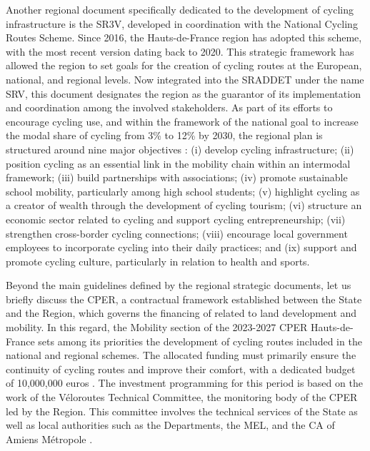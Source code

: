 \begin{refsegment}
Another regional document specifically dedicated to the development of cycling infrastructure is the \acrfull{SR3V}, developed in coordination with the National Cycling Routes Scheme. Since 2016, the Hauts-de-France region has adopted this scheme, with the most recent version dating back to 2020. This strategic framework has allowed the region to set goals for the creation of cycling routes at the European, national, and regional levels. Now integrated into the \acrshort{SRADDET} under the name \acrfull{SRV}, this document designates the region as the guarantor of its implementation and coordination among the involved stakeholders. As part of its efforts to encourage cycling use, and within the framework of the national goal to increase the modal share of cycling from 3\% to 12\% by 2030, the regional plan is structured around nine major objectives \textcolor{blue}{\autocite[10]{region_hauts-de-france_plan_2023}}: (i) develop cycling infrastructure; (ii) position cycling as an essential link in the mobility chain within an intermodal framework; (iii) build partnerships with associations; (iv) promote sustainable school mobility, particularly among high school students; (v) highlight cycling as a creator of wealth through the development of cycling tourism; (vi) structure an economic sector related to cycling and support cycling entrepreneurship; (vii) strengthen cross-border cycling connections; (viii) encourage local government employees to incorporate cycling into their daily practices; and (ix) support and promote cycling culture, particularly in relation to health and sports.%

Beyond the main guidelines defined by the regional strategic documents, let us briefly discuss the \acrfull{CPER}, a contractual framework established between the State and the Region, which governs the financing of  related to land development and mobility. In this regard, the Mobility section of the 2023-2027 \acrshort{CPER} Hauts-de-France sets among its priorities the development of cycling routes included in the national and regional schemes. The allocated funding must primarily ensure the continuity of cycling routes and improve their comfort, with a dedicated budget of 10,000,000 euros \textcolor{blue}{\autocite[87]{region_hauts-de-france_projet_2023}}. The investment programming for this period is based on the work of the Véloroutes Technical Committee, the monitoring body of the \acrshort{CPER} led by the Region. This committee involves the technical services of the State as well as local authorities such as the Departments, the \acrshort{MEL}, and the \acrfull{CA} of Amiens Métropole \textcolor{blue}{\autocite[88]{region_hauts-de-france_projet_2023}}.%


\end{refsegment}
